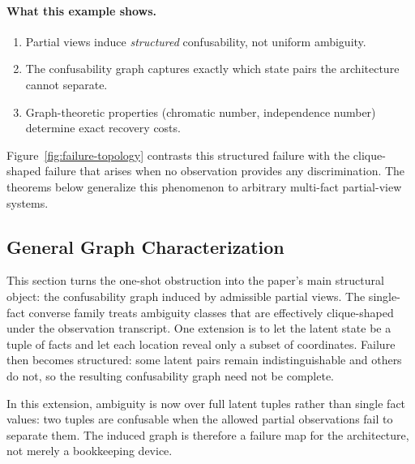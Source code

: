 \paragraph{What this example shows.}
\begin{enumerate}
\item Partial views induce \emph{structured} confusability, not uniform ambiguity.
\item The confusability graph captures exactly which state pairs the architecture cannot separate.
\item Graph-theoretic properties (chromatic number, independence number) determine exact recovery costs.
\end{enumerate}

Figure~\ref{fig:failure-topology} contrasts this structured failure with the clique-shaped failure that arises when no observation provides any discrimination. The theorems below generalize this phenomenon to arbitrary multi-fact partial-view systems.

\subsection{General Graph Characterization}

This section turns the one-shot obstruction into the paper's main structural object: the confusability graph induced by admissible partial views. The single-fact converse family treats ambiguity classes that are effectively clique-shaped under the observation transcript. One extension is to let the latent state be a tuple of facts and let each location reveal only a subset of coordinates. Failure then becomes structured: some latent pairs remain indistinguishable and others do not, so the resulting confusability graph need not be complete.

In this extension, ambiguity is now over full latent tuples rather than single fact values: two tuples are confusable when the allowed partial observations fail to separate them. The induced graph is therefore a failure map for the architecture, not merely a bookkeeping device.

